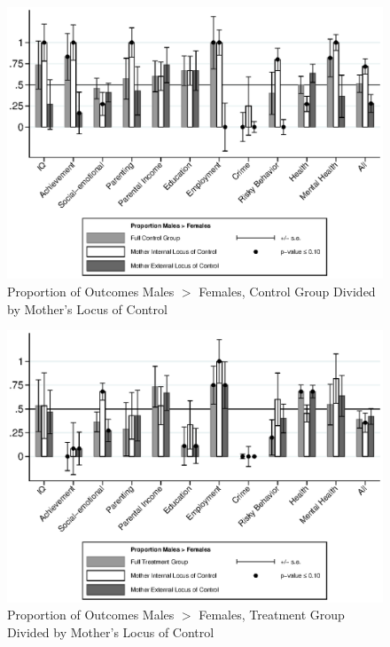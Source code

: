 \begin{figure}
\centering
\caption{Proportion of Outcomes Males $>$ Females, Control Group Divided by Mother's Locus of Control}
\label{mlocus}
\includegraphics[width=\textwidth]{output/gendergaps-control-moderated-mlocus}
\end{figure}

\begin{figure}
\centering
\caption{Proportion of Outcomes Males $>$ Females, Treatment Group Divided by Mother's Locus of Control}
\label{mlocus}
\includegraphics[width=\textwidth]{output/gendergaps-treatment-moderated-mlocus}
\end{figure}



